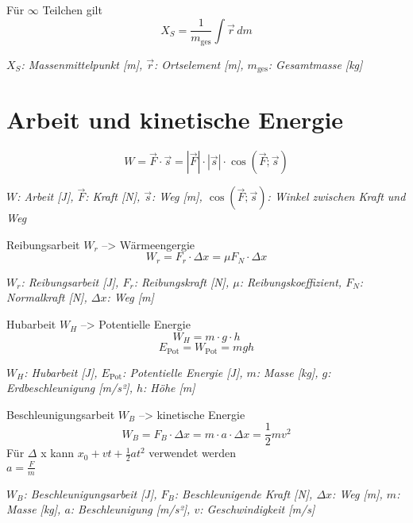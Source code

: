 \documentclass[a4paper,10pt]{article}
\newenvironment{displayformula}
{
	\begin{framed}
		\color{formulaColor}
	}
	{\end{framed}}
\newcommand{\formulalegend}[1]{%
	\par\vspace{0.5ex}%
	{{\color{legendColor}\RaggedRight\small\textit{#1}}}%
	\par\vspace{1.5ex}%
}
\begin{document}
\begin{displayformula}
	Für \( \infty \) Teilchen gilt
	\[
	X_S = \frac{1}{m_{\text{ges}}} \int \vec{r} \, dm
	\]
\end{displayformula}
\formulalegend{
	\( X_S \): Massenmittelpunkt [m], \( \vec{r} \): Ortselement [m], \( m_{\text{ges}} \): Gesamtmasse [kg]
}

\newpage

\section{Arbeit und kinetische Energie}

\begin{displayformula}
	\[
	W = \vec{F} \cdot \vec{s} = |\vec{F}| \cdot |\vec{s}| \cdot \cos(\vec{F}; \vec{s})
	\]
\end{displayformula}
\formulalegend{
	\( W \): Arbeit [J], \( \vec{F} \): Kraft [N], \( \vec{s} \): Weg [m], \( \cos(\vec{F}; \vec{s}) \): Winkel zwischen Kraft und Weg
}

\begin{displayformula}
	Reibungsarbeit \( W_r \) --> Wärmeengergie
	\[
	W_r = F_r \cdot \Delta x = \mu F_N \cdot \Delta x
	\]
\end{displayformula}
\formulalegend{
	\( W_r \): Reibungsarbeit [J], \( F_r \): Reibungskraft [N], \( \mu \): Reibungskoeffizient, \( F_N \): Normalkraft [N], \( \Delta x \): Weg [m]
}

\begin{displayformula}
	Hubarbeit \( W_H \) --> Potentielle Energie
	\[
	W_H = m \cdot g \cdot h
	\]
	\[
	E_{\text{Pot}} = W_{\text{Pot}} = mgh
	\]
\end{displayformula}
\formulalegend{
	\( W_H \): Hubarbeit [J], \( E_{\text{Pot}} \): Potentielle Energie [J], \( m \): Masse [kg], \( g \): Erdbeschleunigung [m/s²], \( h \): Höhe [m]
}

\begin{displayformula}
	Beschleunigungsarbeit \( W_B \) --> kinetische Energie
	\[
	W_B = F_B \cdot \Delta x = m \cdot a \cdot \Delta x = \frac{1}{2} mv^2
	\]
	Für $\Delta$ x kann $x_0 + vt + \frac{1}{2} at^2$ verwendet werden \\
	$a = \frac{F}{m}$
\end{displayformula}
\formulalegend{
	\( W_B \): Beschleunigungsarbeit [J], \( F_B \): Beschleunigende Kraft [N], \( \Delta x \): Weg [m], \( m \): Masse [kg], \( a \): Beschleunigung [m/s²], \( v \): Geschwindigkeit [m/s]
}
\end{document}
